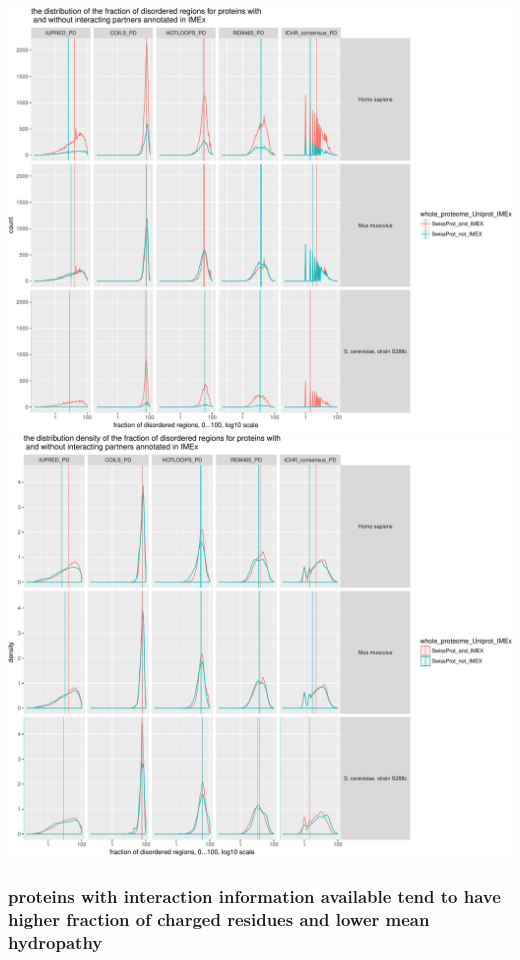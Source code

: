 \documentclass[]{article}
\begin{document}
\includegraphics{final_report_files/figure-latex/physical_properties_plot_disord_dom-1.pdf}
\includegraphics{final_report_files/figure-latex/physical_properties_plot_disord_dom-2.pdf}

\subsubsection{proteins with interaction information available tend to
have higher fraction of charged residues and lower mean
hydropathy}\label{proteins-with-interaction-information-available-tend-to-have-higher-fraction-of-charged-residues-and-lower-mean-hydropathy}
\end{document}

